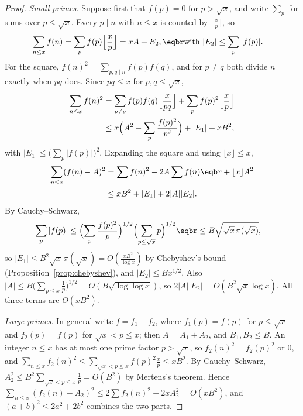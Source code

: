 \begin{proof}
\emph{Small primes.} Suppose first that $f(p)=0$ for $p>\sqrt x$, and write $\sum_p$ for sums over $p\le\sqrt x$. Every $p\mid n$ with $n\le x$ is counted by $\lfloor\frac xp\rfloor$, so
\[
\begin{aligned}\sum_{n\le x}f(n)&=\sum_pf(p)\Bigl\lfloor\frac xp\Bigr\rfloor=xA+E_2,\eqbr\text{with }|E_2|\le\sum_p|f(p)|.\end{aligned}
\]
For the square, $f(n)^2=\sum_{p,q\mid n}f(p)f(q)$, and for $p\ne q$ both divide $n$ exactly when $pq$ does. Since $pq\le x$ for $p,q\le\sqrt x$,
\[
\begin{aligned}\sum_{n\le x}f(n)^2&=\sum_{p\ne q}f(p)f(q)\Bigl\lfloor\frac x{pq}\Bigr\rfloor+\sum_pf(p)^2\Bigl\lfloor\frac xp\Bigr\rfloor\\&\le x\Bigl(A^2-\sum_p\frac{f(p)^2}{p^2}\Bigr)+|E_1|+xB^2,\end{aligned}
\]
with $|E_1|\le\bigl(\sum_p|f(p)|\bigr)^2$. Expanding the square and using $\lfloor x\rfloor\le x$,
\[
\begin{aligned}\sum_{n\le x}(f(n)-A)^2&=\sum f(n)^2-2A\sum f(n)\eqbr+\lfloor x\rfloor A^2\\&\le xB^2+|E_1|+2|A||E_2|.\end{aligned}
\]
By Cauchy--Schwarz,
\[
\begin{aligned}\sum_p|f(p)|&\le\Bigl(\sum_p\frac{f(p)^2}p\Bigr)^{1/2}\Bigl(\sum_{p\le\sqrt x}p\Bigr)^{1/2}\eqbr\le B\sqrt{\sqrt x\,\pi(\sqrt x)},\end{aligned}
\]
so $|E_1|\le B^2\sqrt x\,\pi(\sqrt x)=O(\frac{xB^2}{\log x})$ by Chebyshev's bound
(Proposition~\ref{prop:chebyshev}), and $|E_2|\le Bx^{1/2}$. Also $|A|\le B\bigl(\sum_{p\le x}\frac1p\bigr)^{1/2}=O(B\sqrt{\log\log x})$, so $2|A||E_2|=O(B^2\sqrt x\log x)$. All three terms are $O(xB^2)$.

\emph{Large primes.} In general write $f=f_1+f_2$, where $f_1(p)=f(p)$ for $p\le\sqrt x$ and $f_2(p)=f(p)$ for $\sqrt x<p\le x$; then $A=A_1+A_2$, and $B_1,B_2\le B$. An integer $n\le x$ has at most
one prime factor $p>\sqrt x$, so $f_2(n)^2=f_2(p)^2$ or $0$, and $\sum_{n\le x}f_2(n)^2\le\sum_{\sqrt x<p\le x}f(p)^2\frac xp\le xB^2$. By Cauchy--Schwarz, $A_2^2\le B^2\sum_{\sqrt x<p\le x}\frac1p=O(B^2)$ by
Mertens's theorem. Hence $\sum_{n\le x}(f_2(n)-A_2)^2\le2\sum f_2(n)^2+2xA_2^2=O(xB^2)$, and $(a+b)^2\le2a^2+2b^2$ combines the two parts.
\end{proof}


